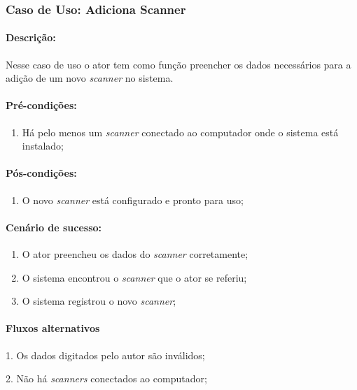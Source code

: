 \newpage
\subsubsection{Caso de Uso: Adiciona Scanner}
 
\paragraph{Descrição:} Nesse caso de uso o ator tem como função preencher os dados necessários para a adição de um novo {\it scanner} no sistema.

\paragraph{Pré-condições:}
\begin{enumerate}
    \item Há pelo menos um {\it scanner} conectado ao computador onde o sistema está instalado;
\end{enumerate}

\paragraph{Pós-condições:} 
\begin{enumerate}
    \item O novo {\it scanner} está configurado e pronto para uso;
\end{enumerate}

\paragraph{Cenário de sucesso:}
\begin{enumerate}
    \item O ator preencheu os dados do {\it scanner} corretamente;
    \item O sistema encontrou o {\it scanner} que o ator se referiu;
    \item O sistema registrou o novo {\it scanner};
\end{enumerate}

\paragraph{Fluxos alternativos}
\begin{description}
    \item 1. Os dados digitados pelo autor são inválidos; 
    \item 2. Não há {\it scanners} conectados ao computador;
\end{description}

